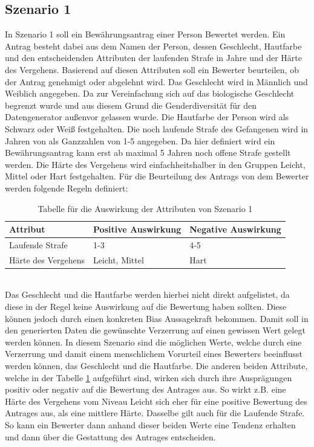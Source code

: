 \begin{onehalfspace}
\subsection{Szenario 1}
\label{subsubsec:szenario1}
In Szenario 1 soll ein Bewährungsantrag einer Person Bewertet werden. Ein Antrag besteht dabei aus dem Namen der Person, dessen Geschlecht, Hautfarbe und den entscheidenden Attributen der laufenden Strafe in Jahre und der Härte des Vergehens. Basierend auf diesen Attributen soll ein Bewerter beurteilen, ob der Antrag genehmigt oder abgelehnt wird. Das Geschlecht wird in \glqq{}Männlich\grqq{} und \glqq{}Weiblich\grqq{} angegeben. Da zur Vereinfachung sich auf das biologische Geschlecht begrenzt wurde und aus diesem Grund die Genderdiversität für den Datengenerator au{\ss}envor gelassen wurde. Die Hautfarbe der Person wird als \glqq{}Schwarz\grqq{} oder \glqq{}Weiß\grqq{} festgehalten. Die noch laufende Strafe des Gefangenen wird in Jahren von als Ganzzahlen von 1-5 angegeben. Da hier definiert wird ein Bewährungsantrag kann erst ab maximal 5 Jahren noch offene Strafe gestellt werden. Die Härte des Vergehens wird einfachheitshalber in den Gruppen \glqq{}Leicht\grqq{}, \glqq{}Mittel\grqq{} oder \glqq{}Hart\grqq{} festgehalten. \newline
Für die Beurteilung des Antrags von dem Bewerter werden folgende Regeln definiert:
\begin{table}[!h]
    \centering
    \begin{tabular}{|l|l|l|}
    \hline
    \textbf{Attribut}   & \textbf{Positive Auswirkung} & \textbf{Negative Auswirkung} \\ \hline
    Laufende Strafe     & 1-3                          & 4-5                          \\ \hline
    Härte des Vergehens & Leicht, Mittel               & Hart                         \\ \hline
    \end{tabular}
\caption{Tabelle für die Auswirkung der Attributen von Szenario 1}
\label{table:1}
\end{table}\\
Das Geschlecht und die Hautfarbe werden hierbei nicht direkt aufgelistet, da diese in der Regel keine Auswirkung auf die Bewertung haben sollten. Diese können jedoch durch einen konkreten Bias Aussagekraft bekommen. Damit soll in den generierten Daten die gewünschte Verzerrung auf einen gewissen Wert gelegt werden können. In diesem Szenario sind die möglichen Werte, welche durch eine Verzerrung und damit einem menschlichem Vorurteil eines Bewerters beeinflusst werden können, das Geschlecht und die Hautfarbe. Die anderen beiden Attribute, welche in der Tabelle \ref*{table:1} aufgeführt sind, wirken sich durch ihre Ausprägungen positiv oder negativ auf die Bewertung des Antrages aus. So wirkt z.B. eine Härte des Vergehens vom Niveau Leicht sich eher für eine positive Bewertung des Antrages aus, als eine mittlere Härte. Dasselbe gilt auch für die Laufende Strafe. So kann ein Bewerter dann anhand dieser beiden Werte eine Tendenz erhalten und dann über die Gestattung des Antrages entscheiden.

\end{onehalfspace}
